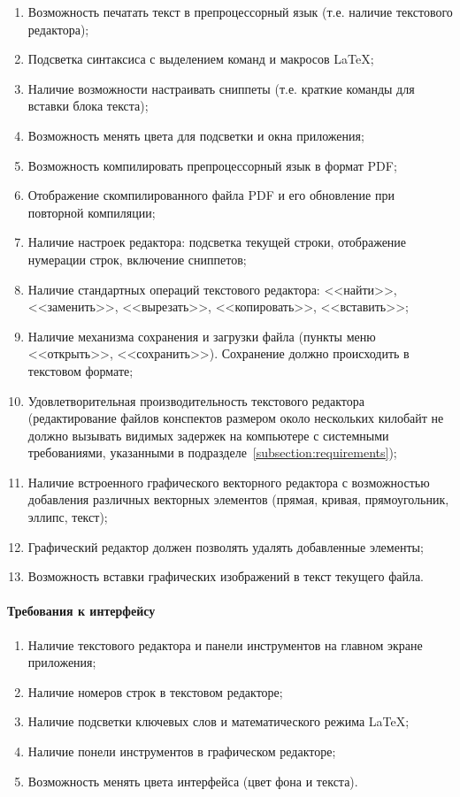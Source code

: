 \documentclass[opermanual]{espd}
\begin{document}
\begin{enumerate}
\item Возможность печатать текст в препроцессорный язык (т.е. наличие текстового редактора);
\item Подсветка синтаксиса с выделением команд и макросов LaTeX;
\item Наличие возможности настраивать сниппеты (т.е. краткие команды для вставки блока текста);
\item Возможность менять цвета для подсветки и окна приложения;
\item Возможность компилировать препроцессорный язык в формат PDF;
\item Отображение скомпилированного файла PDF и его обновление при повторной компиляции;
\item Наличие настроек редактора: подсветка текущей строки, отображение нумерации строк, включение сниппетов;
\item Наличие стандартных операций текстового редактора: <<найти>>, <<заменить>>, <<вырезать>>, <<копировать>>, <<вставить>>;
\item Наличие механизма сохранения и загрузки файла (пункты меню <<открыть>>, <<сохранить>>). Сохранение должно происходить в текстовом формате;
\item Удовлетворительная производительность текстового редактора (редактирование файлов конспектов размером около нескольких килобайт не должно вызывать видимых задержек на компьютере с системными требованиями, указанными в подразделе~\ref{subsection:requirements});
\item Наличие встроенного графического векторного редактора с возможностью добавления различных векторных элементов (прямая, кривая, прямоугольник, эллипс, текст);
\item Графический редактор должен позволять удалять добавленные элементы;
\item Возможность вставки графических изображений в текст текущего файла.
\end{enumerate}

\paragraph{Требования к интерфейсу}

\begin{enumerate}
\item Наличие текстового редактора и панели инструментов на главном экране приложения;
\item Наличие номеров строк в текстовом редакторе;
\item Наличие подсветки ключевых слов и математического режима LaTeX;
\item Наличие понели инструментов в графическом редакторе;
\item Возможность менять цвета интерфейса (цвет фона и текста).
\end{enumerate}
\end{document}
